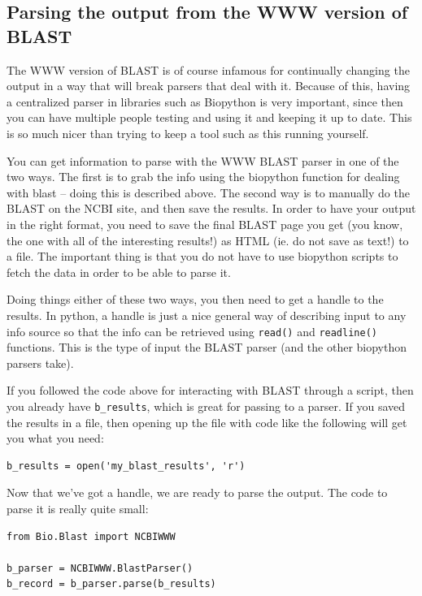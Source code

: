 \documentclass{report}
\begin{document}
\subsection{Parsing the output from the WWW version of BLAST}

The WWW version of BLAST is of course infamous for continually changing the output in a way that will break parsers that deal with it. Because of this, having a centralized parser in libraries such as Biopython is very important, since then you can have multiple people testing and using it and keeping it up to date. This is so much nicer than trying to keep a tool such as this running yourself.


You can get information to parse with the WWW BLAST parser in one of the two ways. The first is to grab the info using the biopython function for dealing with blast -- doing this is described above. The second way is to manually do the BLAST on the NCBI site, and then save the results. In order to have your output in the right format, you need to save the final BLAST page you get (you know, the one with all of the interesting results!) as HTML (ie. do not save as text!) to a file. The important thing is that you do not have to use biopython scripts to fetch the data in order to be able to parse it.


Doing things either of these two ways, you then need to get a handle to the results. In python, a handle is just a nice general way of describing input to any info source so that the info can be retrieved using \verb|read()| and \verb|readline()| functions. This is the type of input the BLAST parser (and the other biopython parsers take). 


If you followed the code above for interacting with BLAST through a script, then you already have \verb|b_results|, which is great for passing to a parser. If you saved the results in a file, then opening up the file with code like the following will get you what you need:

\begin{verbatim}
b_results = open('my_blast_results', 'r')
\end{verbatim}


Now that we've got a handle, we are ready to parse the output. The code to parse it is really quite small:

\begin{verbatim}
from Bio.Blast import NCBIWWW

b_parser = NCBIWWW.BlastParser()
b_record = b_parser.parse(b_results)
\end{verbatim}
\end{document}
